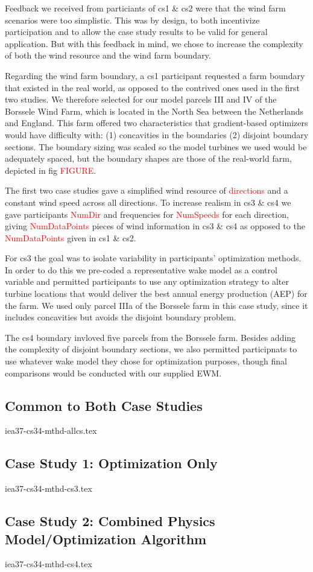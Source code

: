 
Feedback we received from particiants of cs1 \& cs2 were that the wind farm scenarios were too simplistic.
This was by design, to both incentivize participation and to allow the case study results to be valid for general application.
But with this feedback in mind, we chose to increase the complexity of both the wind resource and the wind farm boundary.

Regarding the wind farm boundary, a cs1 participant requested a farm boundary that existed in the real world, as opposed to the contrived ones used in the first two studies.
We therefore selected for our model parcels III and IV of the Borssele Wind Farm, which is located in the North Sea between the Netherlands and England.
This farm offered two characteristics that gradient-based optimizers would have difficulty with: (1) concavities in the boundaries (2) disjoint boundary sections.
The boundary sizing was scaled so the model turbines we used would be adequately spaced, but the boundary shapes are those of the real-world farm, depicted in fig \textcolor{red}{FIGURE}.

The first two case studies gave a simplified wind resource of \textcolor{red}{directions} and a constant wind speed across all directions.
To increase realism in cs3 \& cs4 we gave participants \textcolor{red}{NumDir} and frequencies for \textcolor{red}{NumSpeeds} for each direction, giving \textcolor{red}{NumDataPoints} pieces of wind information in cs3 \& cs4 as opposed to the \textcolor{red}{NumDataPoints} given in cs1 \& cs2.

For cs3 the goal was to isolate variability in participants' optimization methods.
In order to do this we pre-coded a representative wake model as a control variable and permitted participants to use any optimization strategy to alter turbine locations that would deliver the best annual energy production (AEP) for the farm.
We used only parcel IIIa of the Borssele farm in this case study, since it includes concavities but avoids the disjoint boundary problem.

The cs4 boundary invloved five parcels from the Borssele farm.
Besides adding the complexity of disjoint boundary sections, we also permitted participnats to use whatever wake model they chose for optimization purposes, though final comparisons would be conducted with our supplied EWM.

\bigskip
\subsection{Common to Both Case Studies} \label{sec:windfarm}

	{iea37-cs34-mthd-allcs.tex}
	
\subsection{Case Study 1: Optimization Only} \label{sec:cs1}

	{iea37-cs34-mthd-cs3.tex}

\subsection{Case Study 2: Combined Physics Model/Optimization Algorithm} \label{sec:cs2}

	{iea37-cs34-mthd-cs4.tex}